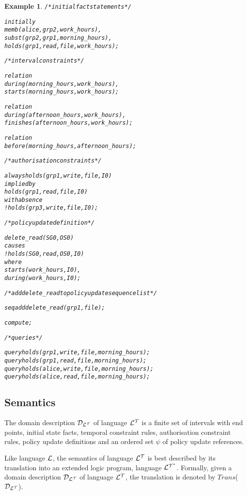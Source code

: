 \documentclass[11pt]{report}
\newtheorem{vexample}{Example}[chapter]
\newenvironment{vverbatim}
{
  \begin{alltt}
}
{
    \vspace{-\baselineskip}
  \end{alltt}
}
\begin{document}
\begin{vexample}
\begin{vverbatim}
  /* initial fact statements */

  initially
    memb(alice, grp2, work\_hours),
    subst(grp2, grp1, morning\_hours),
    holds(grp1, read, file, work\_hours);

  /* interval constraints */

  relation
    during(morning\_hours, work\_hours),
    starts(morning\_hours, work\_hours);

  relation
    during(afternoon\_hours, work\_hours),
    finishes(afternoon\_hours, work\_hours);

  relation
    before(morning\_hours, afternoon\_hours);

  /* authorisation constraints */

  always holds(grp1, write, file, I0)
    implied by
      holds(grp1, read, file, I0)
    with absence
      !holds(grp3, write, file, I0);

  /* policy update definition */

  delete\_read(SG0, OS0)
    causes
      !holds(SG0, read, OS0, I0)
    where
      starts(work\_hours, I0),
      during(work\_hours, I0);

  /* add delete\_read to policy update sequence list */

  seq add delete_read(grp1, file);

  compute;

  /* queries */

  query holds(grp1, write, file, morning\_hours);
  query holds(grp1, read, file, morning\_hours);
  query holds(alice, write, file, morning\_hours);
  query holds(alice, read, file, morning\_hours);
          \end{vverbatim}
        \end{vexample}

      \subsection{Semantics}

        The domain description ${\cal D_{L^T}}$ of language ${\cal L^T}$ is
        a finite set of intervals with end points, initial state facts,
        temporal constraint rules, authorisation constraint rules, policy
        update definitions and an ordered set $\psi$ of policy update
        references.

        Like language ${\cal L}$, the semantics of language ${\cal L^T}$ is
        best described by its translation into an extended logic program,
        language ${\cal L^{T^*}}$. Formally, given a domain description
        ${\cal D_{L^T}}$ of language ${\cal L^T}$, the translation is denoted
        by $Trans$(${\cal D_{L^T}}$).
\end{document}
